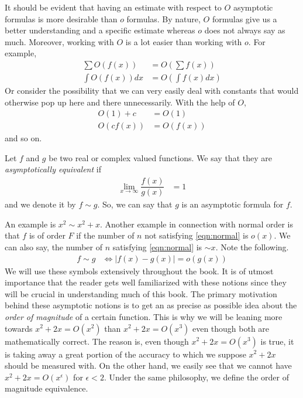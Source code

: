 \documentclass[elemannt.tex]{subfile}
\begin{document}
	It should be evident that having an estimate with respect to $O$ asymptotic formulas is more desirable than $o$ formulas. By nature, $O$ formulas give us a better understanding and a specific estimate whereas $o$ does not always say as much. Moreover, working with $O$ is a lot easier than working with $o$. For example,
		\begin{align*}
			\sum O(f(x))
				& = O\left(\sum f(x)\right)\\
			\int O(f(x))dx
				& = O\left(\int f(x)dx\right)
		\end{align*}
	Or consider the possibility that we can very easily deal with constants that would otherwise pop up here and there unnecessarily. With the help of $O$,
		\begin{align*}
			O(1)+c
				& = O(1)\\
			O(cf(x))
				& = O(f(x))
		\end{align*}
	and so on.
		\begin{definition}[Equivalence]
			Let $f$ and $g$ be two real or complex valued functions. We say that they are \textit{asymptotically equivalent} if
				\begin{align*}
					\lim\limits_{x\to\infty}\dfrac{f(x)}{g(x)}
						& = 1
				\end{align*}
			and we denote it by $f\sim g$. So, we can say that $g$ is an asymptotic formula for $f$.
		\end{definition}
	An example is $x^{2}\sim x^{2}+x$. Another example in connection with normal order is that $f$ is of order $F$ if the number of $n$ not satisfying \ref{eqn:normal} is $o(x)$. We can also say, the number of $n$ satisfying \ref{eqn:normal} is $\sim x$. Note the following.
		\begin{align*}
			f \sim g
				& \iff |f(x)-g(x)|= o(g(x))
		\end{align*}
	We will use these symbols extensively throughout the book. It is of utmost importance that the reader gets well familiarized with these notions since they will be crucial in understanding much of this book. The primary motivation behind these asymptotic notions is to get an as precise as possible idea about the \textit{order of magnitude} of a certain function. This is why we will be leaning more towards $x^{2}+2x=O(x^{2})$ than $x^{2}+2x=O(x^{3})$ even though both are mathematically correct. The reason is, even though $x^{2}+2x=O(x^{3})$ is true, it is taking away a great portion of the accuracy to which we suppose $x^{2}+2x$ should be measured with. On the other hand, we easily see that we cannot have $x^{2}+2x=O(x^{\epsilon})$ for $\epsilon<2$. Under the same philosophy, we define the order of magnitude equivalence.
\end{document}

